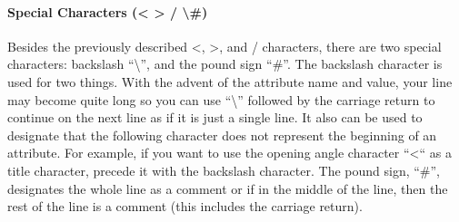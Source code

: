 \paragraph{Special Characters (< > / \textbackslash \#)} Besides the previously described <, >, and / characters, there are two special characters: backslash “\textbackslash”, and the pound sign “\#”. The backslash character is used for two things. With the advent of the attribute name and value, your line may become quite long so you can use “\textbackslash” followed by the carriage return to continue on the next line as if it is just a single line. It also can be used to designate that the following character does not represent the beginning of an attribute. For example, if you want to use the opening angle character “<“ as a title character, precede it with the backslash character. The pound sign, “\#”, designates the whole line as a comment or if in the middle of the line, then the rest of the line is a comment (this includes the carriage return).

